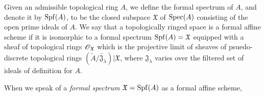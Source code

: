 \begin{defn}[10.1.2]
\label{defn-1.10.1.2}
Given an admissible topological ring $A$, we define the formal spectrum of $A$, and denote
it by ${\mathop{\mathrm{Spf}}\nolimits}(A)$, to be the closed subspace $\mathfrak{X}$ of ${\mathop{\mathrm{Spec}}\nolimits}(A)$ consisting of the
open prime ideals of $A$. We say that a topologically ringed space is a formal affine scheme
if it is isomorphic to a formal spectrum ${\mathop{\mathrm{Spf}}\nolimits}(A)=\mathfrak{X}$ equipped with a sheaf of
topological rings $\mathscr{O}_\mathfrak{X}$ which is the projective limit of sheaves of
psuedo-discrete topological rings
$(\widetilde{A}/\widetilde{\mathfrak{J}_\lambda})|\mathfrak{X}$, where $\mathfrak{J}_\lambda$
varies over the filtered set of ideals of definition for $A$.
\end{defn}

When we speak of a {\em formal spectrum $\mathfrak{X}={\mathop{\mathrm{Spf}}\nolimits}(A)$} as a formal affine scheme,

